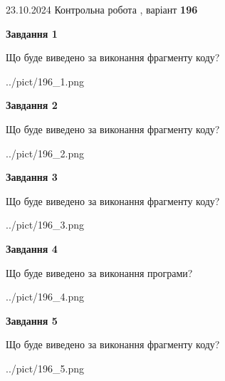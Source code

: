 \documentclass[12pt, ukrainian]{article}
\begin{document}
{\Large{23.10.2024 Контрольна робота , варіант  \No \textbf { 196 }\par}}
{
\begin {large}
{\begin {center}\textbf{Завдання 1}\end {center}}

Що буде виведено за виконання фрагменту коду?\par
\begin{center}
	{../pict/196_1.png}
\end{center}
\newpage

{\begin {center}\textbf{Завдання 2}\end {center}}

Що буде виведено за виконання фрагменту коду?\par
\begin{center}
	{../pict/196_2.png}
\end{center}
\newpage

{\begin {center}\textbf{Завдання 3}\end {center}}

Що буде виведено за виконання фрагменту коду?\par
\begin{center}
	{../pict/196_3.png}
\end{center}
\newpage

{\begin {center}\textbf{Завдання 4}\end {center}}

Що буде виведено за виконання програми?\par
\begin{center}
	{../pict/196_4.png}
\end{center}
\newpage

{\begin {center}\textbf{Завдання 5}\end {center}}

Що буде виведено за виконання фрагменту коду?\par
\begin{center}
	{../pict/196_5.png}
\end{center}
\newpage


\end{large}}
\end{document}
